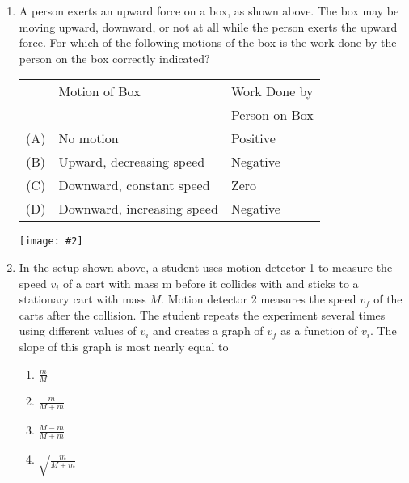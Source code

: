 \documentclass[11pt]{article}
\newcommand{\pic}[2]{\texttt{[image: \#2]}}
\begin{document}
\begin{multicols}{2}
\begin{enumerate}[leftmargin=18pt,resume]
    \begin{center}
      \pic{.1}{push}
    \end{center}
  \item A person exerts an upward force on a box, as shown above. The box may be
    moving upward, downward, or not at all while the person exerts the upward
    force. For which of the following motions of the box is the work done by the
    person on the box correctly indicated?

    \begin{tabular}{cll}
      & Motion of Box & Work Done by\\
      &               & Person on Box \\
      \hline
      (A) & No motion                      & Positive \\
      (B) & Upward, decreasing speed   & Negative \\
      (C) & Downward, constant speed   & Zero     \\
      (D) & Downward, increasing speed & Negative
    \end{tabular}
    \vspace{.7in}
    
    \begin{center}
      \pic{.48}{car-collision}
    \end{center}
  \item In the setup shown above, a student uses motion detector 1 to measure
    the speed $v_i$ of a cart with mass m before it collides with and sticks to
    a stationary cart with mass $M$. Motion detector 2 measures the speed $v_f$
    of the carts after the collision. The student repeats the experiment
    several times using different values of $v_i$ and creates a graph of $v_f$
    as a function of $v_i$. The slope of this graph is most nearly equal to
    \begin{enumerate}[nosep,leftmargin=18pt,label=(\Alph*)]
    \item$\displaystyle\frac{m}{M}$
    \item$\displaystyle\frac{m}{M+m}$
    \item$\displaystyle\frac{M-m}{M+m}$
    \item$\displaystyle\sqrt{\frac{m}{M+m}}$
    \end{enumerate}
    

\end{enumerate}
\end{multicols}
\end{document}
